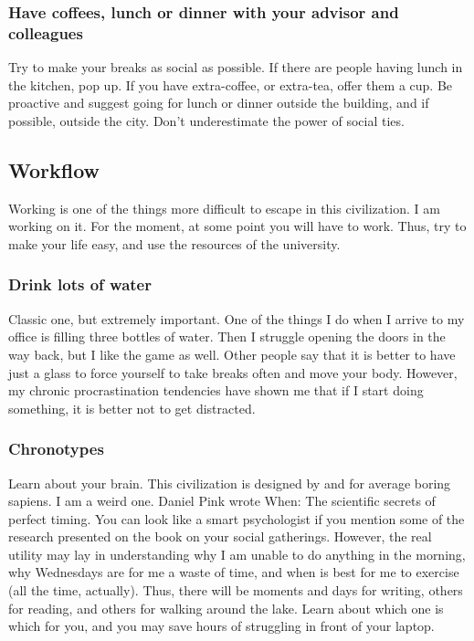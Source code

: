 \documentclass{article}
\begin{document}
\subsubsection{Have coffees, lunch or dinner with your advisor and colleagues}
\label{subsubsec: coffees}
Try to make your breaks as social as possible. If there are people having lunch in the kitchen, pop up. If you have extra-coffee, or extra-tea, offer them a cup. Be proactive and suggest going for lunch or dinner outside the building, and if possible, outside the city. Don’t underestimate the power of social ties. 

\subsection{Workflow}
\label{subsec: workflow}
Working is one of the things more difficult to escape in this civilization. I am working on it. For the moment, at some point you will have to work. Thus, try to make your life easy, and use the resources of the university. 
\subsubsection{Drink lots of water}
\label{subsubsec: water}
Classic one, but extremely important. One of the things I do when I arrive to my office is filling three bottles of water. Then I struggle opening the doors in the way back, but I like the game as well. Other people say that it is better to have just a glass to force yourself to take breaks often and move your body. However, my chronic procrastination tendencies have shown me that if I start doing something, it is better not to get distracted. 
\subsubsection{Chronotypes}
\label{subsubsec: Chronotypes}
Learn about your brain. This civilization is designed by and for average boring sapiens. I am a weird one. Daniel Pink wrote When: The scientific secrets of perfect timing. You can look like a smart psychologist if you mention some of the research presented on the book on your social gatherings. However, the real utility may lay in understanding why I am unable to do anything in the morning, why Wednesdays are for me a waste of time, and when is best for me to exercise (all the time, actually). Thus, there will be moments and days for writing, others for reading, and others for walking around the lake. Learn about which one is which for you, and you may save hours of struggling in front of your laptop.
\end{document}
